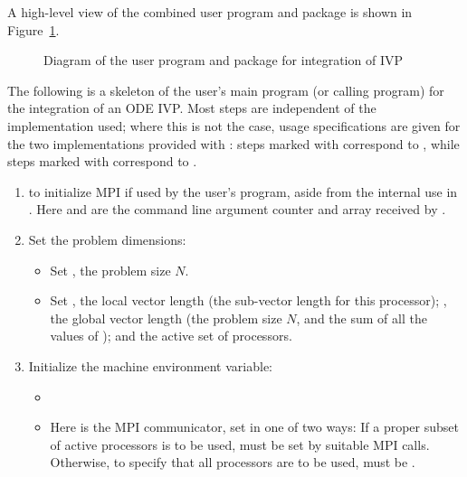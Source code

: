 A high-level view of the combined user program and {\cvode} package is
shown in Figure~\ref{f:sim_overview}.
\begin{figure}
\centerline{}
\caption {Diagram of the user program and 
  {\cvode} package for integration of IVP}\label{f:sim_overview}
\end{figure}
The following is a skeleton of the user's main program (or calling
program) for the integration of an ODE IVP. Most steps are independent of the {\nvector}
implementation used; where this is not the case, usage specifications are given for the
two implementations provided with {\cvode}: steps marked with {\p} correspond to 
{\nvecp}, while steps marked with {\s} correspond to {\nvecs}.
%
\begin{enumerate}
  
\item {\p}
   to initialize MPI if used by
  the user's program, aside from the internal use in {\nvecp}.  
  Here  and  are the command line argument 
  counter and array received by .
  
\item Set the problem dimensions:
  \begin{itemize}
  \item {\s}
    Set , the problem size $N$.
  \item {\p} 
    Set , the local vector length (the sub-vector
    length for this processor); , the global vector length (the
    problem size $N$, and the sum of all the values of );
    and the active set of processors.
  \end{itemize}
  
\item Initialize the machine environment variable:
  \begin{itemize}
  \item {\s}
  \item {\p}
    Here  is the MPI communicator, set in one of two ways: 
    If a proper subset of active processors is to be used,  
    must be set by suitable MPI calls. Otherwise, to specify that all 
    processors are to be used,  must be .
  \end{itemize}
  

\end{enumerate}
